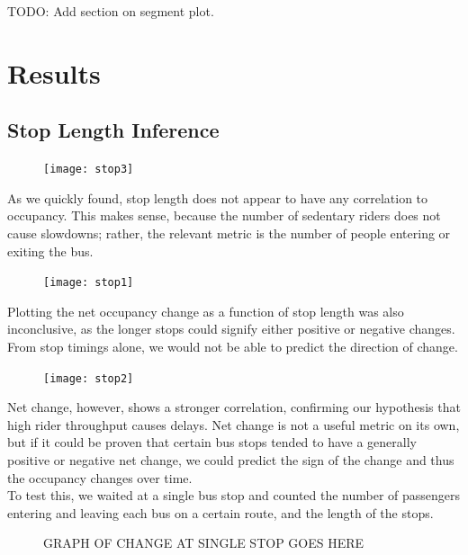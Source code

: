 \documentclass[letterpaper,abstract=on,titlepage=false]{scrreprt}
\begin{document}
TODO: Add section on segment plot.

\section*{Results}

\subsection*{Stop Length Inference}
	\begin{figure}[H]
	\texttt{[image: stop3]}
	\centering
	\end{figure}
	As we quickly found, stop length does not appear to have any correlation to occupancy.
	This makes sense, because the number of sedentary riders does not cause slowdowns; rather, the relevant metric is the number of people entering or exiting the bus.

	\begin{figure}[H]
	\texttt{[image: stop1]}
	\centering
	\end{figure}

	Plotting the net occupancy change as a function of stop length was also inconclusive, as the longer stops could signify either positive or negative changes.
	From stop timings alone, we would not be able to predict the direction of change.

	\begin{figure}[H]
	\texttt{[image: stop2]}
	\centering
	\end{figure}

	Net change, however, shows a stronger correlation, confirming our hypothesis that high rider throughput causes delays.
	Net change is not a useful metric on its own, but if it could be proven that certain bus stops tended to have a generally positive or negative net change, we could predict the sign of the change and thus the occupancy changes over time.
	\\
	To test this, we waited at a single bus stop and counted the number of passengers entering and leaving each bus on a certain route, and the length of the stops.

	\begin{figure}[H]
	GRAPH OF CHANGE AT SINGLE STOP GOES HERE
	\centering
	\end{figure}
\end{document}
